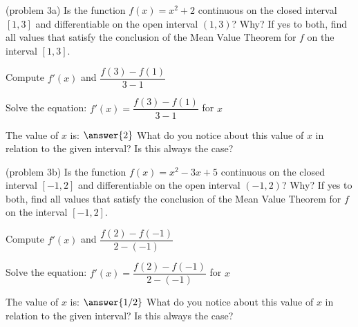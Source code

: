 \documentclass[handout]{ximera}
\begin{document}
\begin{example}[example 3]
\begin{image}
\end{image}


\end{example}

\begin{problem}(problem 3a)
  Is the function $f(x) = x^2 + 2$ continuous on the closed interval $[1,3]$ and differentiable on the open interval $(1,3)$? Why?
  If yes to both, find all values that satisfy the conclusion of the Mean Value Theorem for $f$ on the interval $[1,3]$.
	
    \begin{hint}
      Compute $f'(x)$ and $\dfrac{f(3) - f(1)}{3-1}$
    \end{hint}
		\begin{hint}
		  Solve the equation: $f'(x) = \dfrac{f(3) - f(1)}{3-1}$ for $x$
		\end{hint}
		
		The value of $x$ is:
		 $\answer{2}$
     What do you notice about this value of $x$ in relation to the given interval? Is this always the case?
\end{problem}

\begin{problem}(problem 3b)
  Is the function $f(x) = x^2 -3x + 5$ continuous on the closed interval $[-1,2]$ and differentiable on the open interval $(-1,2)$? Why?
  If yes to both, find all values that satisfy the conclusion of the Mean Value Theorem for $f$ on the interval $[-1,2]$.
	
    \begin{hint}
      Compute $f'(x)$ and $\dfrac{f(2) - f(-1)}{2-(-1)}$
    \end{hint}
		\begin{hint}
		  Solve the equation: $f'(x) = \dfrac{f(2) - f(-1)}{2-(-1)}$ for $x$
		\end{hint}
		
		The value of $x$ is:
		 $\answer{1/2}$
 What do you notice about this value of $x$ in relation to the given interval? Is this always the case?
\end{problem}
\end{document}

